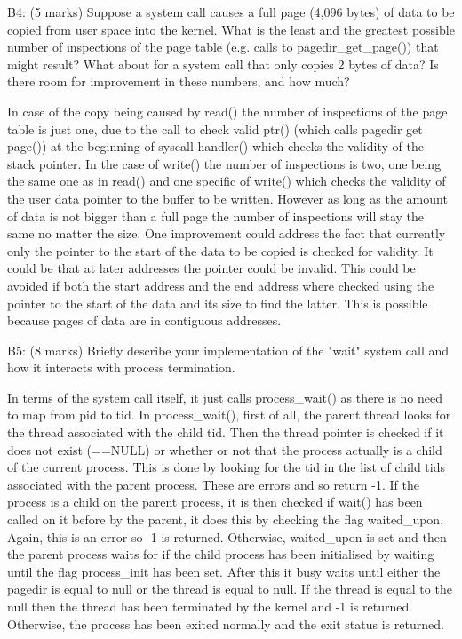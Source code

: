 
\noindent B4: (5 marks)
Suppose a system call causes a full page (4,096 bytes) of data
to be copied from user space into the kernel.  What is the least and the greatest possible number of inspections of the page table (e.g. calls to pagedir\_get\_page()) that might result?  What about for a system call that only copies 2 bytes of data?  Is there room for improvement in these numbers, and how much?


In case of the copy being caused by read() the number of inspections of the page table is just one, due to the call to check valid ptr() (which calls pagedir get page()) at the beginning of syscall handler() which checks the validity of the stack pointer. In the case of write() the number of inspections is two, one being the same one as in read() and one specific of write() which checks the validity of the user data pointer to the buffer to be written.
However as long as the amount of data is not bigger than a full page the number of inspections will stay the same no matter the size.
One improvement could address the fact that currently only the pointer to the start of the data to be copied is checked for validity. It could be that at later addresses the pointer could be invalid. This could be avoided if both the start address and the end address where checked using the pointer to the start of the data and its size to find the latter. This is possible because pages of data are in contiguous addresses.


\noindent B5: (8 marks)
Briefly describe your implementation of the "wait" system call
and how it interacts with process termination.


In terms of the system call itself, it just calls process\_wait() as there is no need to map from pid to tid. In process\_wait(), first of all, the parent thread looks for the thread associated with the child tid. Then the thread pointer is checked if it does not exist (==NULL) or whether or not that the process actually is a child of the current process. This is done by looking for the tid in the list of child tids associated with the parent process. These are errors and so return -1.
If the process is a child on the parent process, it is then checked if wait() has been called on it before by the parent, it does this by checking the flag waited\_upon. Again, this is an error so -1 is returned. Otherwise, waited\_upon is set and then the parent process waits for if the child process has been initialised by waiting until the flag process\_init has been set. After this it busy waits until either the pagedir is equal to null or the thread is equal to null. If the thread is equal to the null then the thread has been terminated by the kernel and -1 is returned. Otherwise, the process has been exited normally and the exit status is returned.

